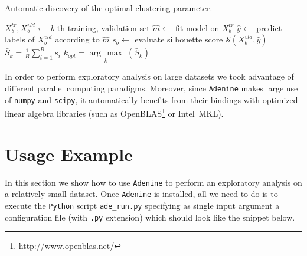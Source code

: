 \documentclass[twoside,11pt]{article}
\makeatletter
\newcommand{\argmax}[1]{\underset{#1}{\operatorname{arg}\,\operatorname{max}}\;}
\newcommand{\ade}{\texttt{Adenine}\@\xspace}
\newcommand{\py}{\texttt{Python}\@\xspace}
\makeatother
\begin{document}
\begin{algorithm}
\caption{Automatic discovery of the optimal clustering parameter.}\label{alg:clusters}
\label{alg:clusters}
\begin{algorithmic}[1]
                \State $X^{tr}_b,X^{vld}_b\leftarrow$ $b$-th training, validation set
                \State $\hat{m}\leftarrow$ fit model on $X^{tr}_b$
                \State $\hat{y}\leftarrow$ predict labels of $X^{vld}_b$ according to $\hat{m}$
                \State $s_b\leftarrow$ evaluate silhouette score  $\mathcal{S}(X^{vld}_b,\hat{y})$
	\EndFor    
	\State $\bar{S}_k = \frac{1}{B}\sum_{i=1}^B s_i$
\EndFor
\State $k_{opt} = \argmax{k}(\bar{S}_k)$
\end{algorithmic}
\end{algorithm}


\noindent In order to perform exploratory analysis on large datasets we took advantage of different parallel computing paradigms. %
Moreover, since \ade makes large use of \texttt{numpy} and \texttt{scipy}, it automatically benefits from their bindings with optimized linear algebra libraries (such as OpenBLAS\footnote{\url{http://www.openblas.net/}} or Intel\textsuperscript{\textregistered}~MKL).

\section{Usage Example}
In this section we show how to use \ade to perform an exploratory analysis on a relatively small dataset. Once \ade is installed, all we need to do is to execute the \py script \texttt{ade\_run.py} specifying as single input argument a configuration file (with \texttt{.py} extension) which should look like the snippet below.
 

\end{document}
